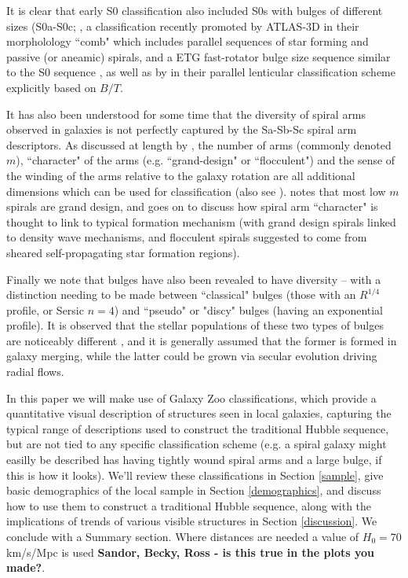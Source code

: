 \documentclass[usenatbib]{mn2e}
\begin{document}
It is clear that early S0 classification also included S0s with bulges of different sizes (S0a-S0c; \citealt{SpitzerBaade1951, vandenBergh1976}, a classification recently promoted by ATLAS-3D in their morpholology ``comb" which includes parallel sequences of star forming and passive (or aneamic) spirals, and a ETG fast-rotator bulge size sequence similar to the S0 sequence \citep{2011MNRAS.416.1680C}, as well as by \citet{Kormendy2012} in their parallel lenticular classification scheme explicitly based on $B/T$. 


It has also been understood for some time that the diversity of spiral arms observed in galaxies is not perfectly captured by the Sa-Sb-Sc spiral arm descriptors. As discussed at length by \citet{Buta2013}, the number of arms (commonly denoted $m$), ``character" of the arms (e.g. ``grand-design" or ``flocculent") and the sense of the winding of the arms relative to the galaxy rotation are all additional dimensions which can be used for classification (also see \citealt{1987ApJ...314....3E,AnnLee2013}). \citet{Buta2013} notes that most low $m$ spirals are grand design, and goes on to discuss how spiral arm ``character" is thought to link to typical formation mechanism (with grand design spirals linked to density wave mechanisms, and flocculent spirals suggested to come from sheared self-propagating star formation regions). 

Finally we note that bulges have also been revealed to have diversity -- with a distinction needing to be made between ``classical" bulges (those with an $R^{1/4}$ profile, or Sersic $n=4$) and ``pseudo" or "discy" bulges (having an exponential profile). It is observed that the stellar populations of these two types of bulges are noticeably different \citep{FisherDrory}, and it is generally assumed that the former is formed in galaxy merging, while the latter could be grown via secular evolution driving radial flows. 

In this paper we will make use of Galaxy Zoo classifications, which provide a quantitative visual description of structures seen in local galaxies, capturing the typical range of descriptions used to construct the traditional Hubble sequence, but are not tied to any specific classification scheme (e.g. a spiral galaxy might easilly be described has having tightly wound spiral arms and a large bulge, if this is how it looks). We'll review these classifications in Section \ref{sample}, give basic demographics of the local sample in Section \ref{demographics}, and discuss how to use them to construct a traditional Hubble sequence, along with the implications of trends of various visible structures in Section \ref{discussion}. We conclude with a Summary section. Where distances are needed a value of $H_0 = 70$km/s/Mpc is used {\bf Sandor, Becky, Ross - is this true in the plots you made?}. 
\end{document}

